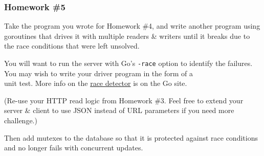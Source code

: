 \documentclass[handout,compress,t,11pt]{beamer}
\begin{document}
\begin{frame}[fragile]
\frametitle{Homework \#5}
{\small {}Take the program you wrote for Homework \#4, and write
another program using goroutines that drives it with multiple readers \& writers 
until it breaks due to the race conditions that were left unsolved. \par
    \vspace{0.4\baselineskip}
You will want to run the server with Go's \verb|-race| option to identify the 
failures. You may wish to write your driver program in the form of a \\
unit test. More info on the
\href{https://golang.org/doc/articles/race_detector.html}{race detector} is
on the Go site. \par
    \vspace{0.4\baselineskip}
(Re-use your HTTP read logic from Homework \#3. Feel free to extend your server \&
client to use JSON instead of URL parameters if you need more challenge.) \par
    \vspace{0.4\baselineskip}
Then add mutexes to the database so that it is protected against race conditions
and no longer fails with concurrent updates.}
\end{frame}
\end{document}
